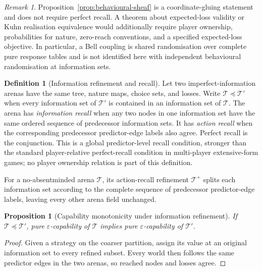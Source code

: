 \documentclass[11pt]{article}
\theoremstyle{plain}
\newtheorem{proposition}[theorem]{Proposition}
\theoremstyle{definition}
\newtheorem{definition}[theorem]{Definition}
\theoremstyle{remark}
\newtheorem{remark}[theorem]{Remark}
\newcommand{\eps}{\varepsilon}
\begin{document}
\begin{remark}
Proposition~\ref{prop:behavioural-sheaf} is a coordinate-gluing statement and
does not require perfect recall. A theorem about expected-loss validity or
Kuhn realisation equivalence would additionally require player ownership,
probabilities for nature, zero-reach conventions, and a specified expected-loss
objective. In particular, a Bell coupling is shared randomisation over complete
pure response tables and is not identified here with independent behavioural
randomisation at information sets.
\end{remark}


\begin{definition}[Information refinement and recall]
\label{def:information-refinement}
Let two imperfect-information arenas have the same tree, nature maps, choice
sets, and losses. Write $\mathcal T\preceq\mathcal T'$ when every information
set of $\mathcal T'$ is contained in an information set of $\mathcal T$.
The arena has \emph{information recall} when any two nodes in one information
set have the same ordered sequence of predecessor information sets. It has
\emph{action recall} when the corresponding predecessor predictor-edge labels
also agree. Perfect recall is the conjunction. This is a global predictor-level recall
condition, stronger than the standard player-relative perfect-recall condition
in multi-player extensive-form games; no player ownership relation is part of
this definition.

For a no-absentminded arena $\mathcal T$, its action-recall refinement
$\mathcal T^+$ splits each information set according to the complete sequence
of predecessor predictor-edge labels, leaving every other arena field
unchanged.
\end{definition}

\begin{proposition}[Capability monotonicity under information refinement]
\label{prop:information-refinement}
If $\mathcal T\preceq\mathcal T'$, pure $\eps$-capability of $\mathcal T$
implies pure $\eps$-capability of $\mathcal T'$.
\end{proposition}

\begin{proof}
Given a strategy on the coarser partition, assign its value at an original
information set to every refined subset. Every world then follows the same
predictor edges in the two arenas, so reached nodes and losses agree.
\end{proof}
\end{document}
